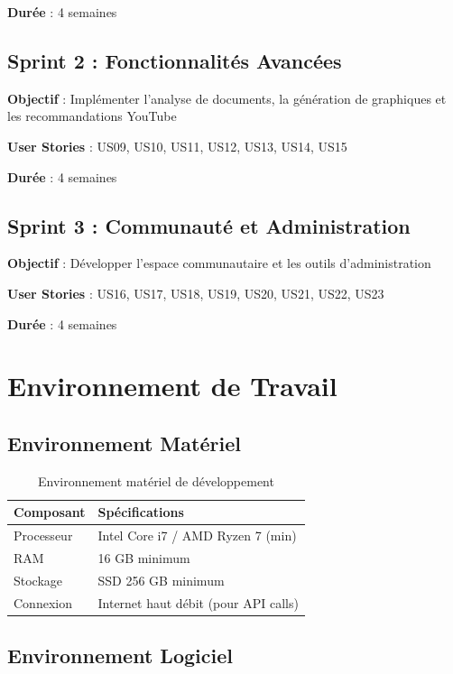 \textbf{Durée} : 4 semaines

\subsection{Sprint 2 : Fonctionnalités Avancées}

\textbf{Objectif} : Implémenter l'analyse de documents, la génération de graphiques et les recommandations YouTube

\textbf{User Stories} : US09, US10, US11, US12, US13, US14, US15

\textbf{Durée} : 4 semaines

\subsection{Sprint 3 : Communauté et Administration}

\textbf{Objectif} : Développer l'espace communautaire et les outils d'administration

\textbf{User Stories} : US16, US17, US18, US19, US20, US21, US22, US23

\textbf{Durée} : 4 semaines

\section{Environnement de Travail}

\subsection{Environnement Matériel}

\begin{table}[H]
\centering
\caption{Environnement matériel de développement}
\label{tab:env-materiel}
\begin{tabular}{|l|l|}
\hline
\textbf{Composant} & \textbf{Spécifications} \\
\hline
Processeur & Intel Core i7 / AMD Ryzen 7 (min) \\
\hline
RAM & 16 GB minimum \\
\hline
Stockage & SSD 256 GB minimum \\
\hline
Connexion & Internet haut débit (pour API calls) \\
\hline
\end{tabular}
\end{table}

\subsection{Environnement Logiciel}


